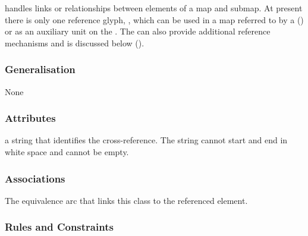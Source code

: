  handles links or relationships between elements of a
map and submap. At present there is only one reference glyph,
, which can be used in a map referred to by a 
() or as an auxiliary unit on the . The
 can also provide additional reference mechanisms
and is discussed below ().

\subsubsection{Generalisation}

None

\subsubsection{Attributes}

\begin{attributes}
   a string that identifies the
  cross-reference. The string cannot start and end in white space and
  cannot be empty.
\end{attributes}

\subsubsection{Associations}

\begin{attributes}
   The
  equivalence arc that links this class to the referenced element.
\end{attributes}

\subsubsection{Rules and Constraints}

\begin{valrules}
\end{valrules}



